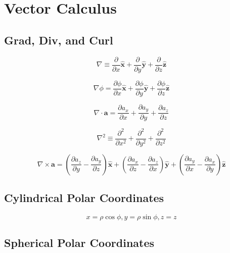\chapter{Vector Calculus}

\section{Grad, Div, and Curl}

\begin{equation*}
    \nabla \equiv \frac{\partial}{\partial x}\boldsymbol{\hat{x}} +
    \frac{\partial}{\partial y}\boldsymbol{\hat{y}} +
    \frac{\partial}{\partial z}\boldsymbol{\hat{z}}
\end{equation*}

\begin{equation*}
    \nabla\phi = \frac{\partial\phi}{\partial x}\boldsymbol{\hat{x}} +
    \frac{\partial\phi}{\partial y}\boldsymbol{\hat{y}} +
    \frac{\partial\phi}{\partial z}\boldsymbol{\hat{z}}
\end{equation*}

\begin{equation*}
    \nabla \cdot \boldsymbol{a} = \frac{\partial a_{x}}{\partial x} + \frac{\partial a_{y}}{\partial y} + \frac{\partial a_{z}}{\partial z} 
\end{equation*}

\begin{equation*}
    \nabla^2 \equiv \frac{\partial^2}{\partial x^2} +
    \frac{\partial^2}{\partial y^2} +
    \frac{\partial^2}{\partial z^2}
\end{equation*}

\begin{equation*}
    \nabla \times \boldsymbol{a} = 
    \left(\frac{\partial a_z}{\partial y} - \frac{\partial a_y}{\partial z}\right)\boldsymbol{\hat{x}} + 
    \left(\frac{\partial a_x}{\partial z} - \frac{\partial a_z}{\partial x}\right)\boldsymbol{\hat{y}} + 
    \left(\frac{\partial a_y}{\partial x} - \frac{\partial a_x}{\partial y}\right)\boldsymbol{\hat{z}}
\end{equation*}

\section{Cylindrical Polar Coordinates}

\[ x = \rho\cos\phi, y = \rho\sin\phi, z = z\]

\section{Spherical Polar Coordinates}

